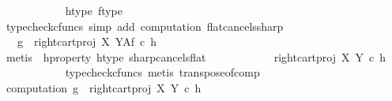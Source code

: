 \begin{isabellebody}
\ \ \ \ \ \ \ \ \ \ \isamarkupfalse%
\ h{\isacharunderscore}{\kern0pt}type\ f{\isacharunderscore}{\kern0pt}type\ \isamarkupfalse%
\ {\isacharparenleft}{\kern0pt}typecheck{\isacharunderscore}{\kern0pt}cfuncs{\isacharcomma}{\kern0pt}\ simp\ add{\isacharcolon}{\kern0pt}\ computation{}\ flat{\isacharunderscore}{\kern0pt}cancels{\isacharunderscore}{\kern0pt}sharp{\isacharparenright}{\kern0pt}\isanewline
\ \ \ \ \ \ \ \ \isamarkupfalse%
\ \ \ {\isachardoublequoteopen}g\ {\isacharequal}{\kern0pt}\ {\isacharparenleft}{\kern0pt}{\isacharparenleft}{\kern0pt}right{\isacharunderscore}{\kern0pt}cart{\isacharunderscore}{\kern0pt}proj\ X\ Y{\isacharparenright}{\kern0pt}\isactrlbsup A\isactrlesup \isactrlsub f{\isacharparenright}{\kern0pt}\ {\isasymcirc}\isactrlsub c\ {\isacharparenleft}{\kern0pt}h\isactrlsup {\isasymflat}{\isacharparenright}{\kern0pt}\isactrlsup {\isasymsharp}{\isachardoublequoteclose}\isanewline
\ \ \ \ \ \ \ \ \ \ \isamarkupfalse%
\ {\isacharparenleft}{\kern0pt}metis\ \ h{\isacharunderscore}{\kern0pt}property{}\ h{\isacharunderscore}{\kern0pt}type\ sharp{\isacharunderscore}{\kern0pt}cancels{\isacharunderscore}{\kern0pt}flat{\isacharparenright}{\kern0pt}\isanewline
\ \ \ \ \ \ \ \ \isamarkupfalse%
\ {\isachardoublequoteopen}{\isachardot}{\kern0pt}{\isachardot}{\kern0pt}{\isachardot}{\kern0pt}\ {\isacharequal}{\kern0pt}\ {\isacharparenleft}{\kern0pt}{\isacharparenleft}{\kern0pt}right{\isacharunderscore}{\kern0pt}cart{\isacharunderscore}{\kern0pt}proj\ X\ Y{\isacharparenright}{\kern0pt}\ {\isasymcirc}\isactrlsub c\ h\isactrlsup {\isasymflat}{\isacharparenright}{\kern0pt}\isactrlsup {\isasymsharp}{\isachardoublequoteclose}\isanewline
\ \ \ \ \ \ \ \ \ \ \isamarkupfalse%
\ {\isacharparenleft}{\kern0pt}typecheck{\isacharunderscore}{\kern0pt}cfuncs{\isacharcomma}{\kern0pt}\ metis\ transpose{\isacharunderscore}{\kern0pt}of{\isacharunderscore}{\kern0pt}comp{\isacharparenright}{\kern0pt}\isanewline
\ \ \ \ \ \ \ \ \isamarkupfalse%
\ computation{}{\isacharcolon}{\kern0pt}\ {\isachardoublequoteopen}g\ {\isacharequal}{\kern0pt}\ {\isacharparenleft}{\kern0pt}{\isacharparenleft}{\kern0pt}right{\isacharunderscore}{\kern0pt}cart{\isacharunderscore}{\kern0pt}proj\ X\ Y{\isacharparenright}{\kern0pt}\ {\isasymcirc}\isactrlsub c\ h\isactrlsup {\isasymflat}{\isacharparenright}{\kern0pt}\isactrlsup {\isasymsharp}{\isachardoublequoteclose}\isanewline
\ \ \ \ \ \ \ \ \ \ \ \isamarkupfalse%

\end{isabellebody}
